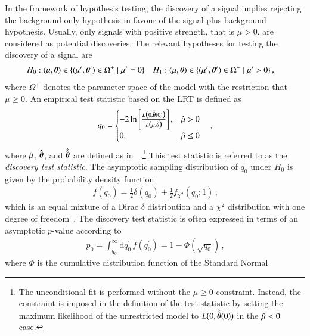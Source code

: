 In the framework of hypothesis testing, the discovery of a signal implies
rejecting the background-only hypothesis in favour of the signal-plus-background
hypothesis. Usually, only signals with positive strength, that is $\mu > 0$, are
considered as potential discoveries. The relevant hypotheses for testing the
discovery of a signal are
\begin{align*}
  &H_0: (\mu, \myvec{\theta}) \in \{ (\mu^\prime, \myvec{\theta}^\prime) \in \Omega^+ \mid \mu^\prime = 0 \}
  &&H_1: (\mu, \myvec{\theta}) \in \{ (\mu^\prime, \myvec{\theta}^\prime) \in \Omega^+ \mid \mu^\prime > 0 \} \,\text{,}
\end{align*}
where $\Omega^+$ denotes the parameter space of the model with the restriction
that $\mu \geq 0$. An empirical test statistic based on the LRT is defined as
\begin{align*}
  q_0 = \begin{cases}
          -2 \ln \left[ \frac{ L\bigl(0, \hat{\hat{\myvec{\theta}}}(0) \bigr)}{L\bigl( \muhat, \hat{\myvec{\theta}} \bigr)} \right], & \muhat > 0 \\
          0,          & \muhat \leq 0
        \end{cases} \quad\text{,}
\end{align*}
where $\hat{\mu}$, $\hat{\myvec{\theta}}$, and $\hat{\hat{\myvec{\theta}}}$ are
defined as in
~\cite{Cowan:2010js}.\footnote{The
  unconditional fit is performed without the $\mu \geq 0$ constraint. Instead,
  the constraint is imposed in the definition of the test statistic by setting
  the maximum likelihood of the unrestricted model to
  $L\bigl( 0, \hat{\hat{\myvec{\theta}}}(0) \bigr)$ in the $\hat{\mu} < 0$ case.}
This test statistic is referred to as the \emph{discovery test statistic}. The
asymptotic sampling distribution of $q_0$ under $H_0$ is given by the
probability density function
\begin{align*}
  f(q_0) = \frac{1}{2} \delta(q_0) + \frac{1}{2} f_{\chi^2}(q_0; 1) \,\text{,}
\end{align*}
which is an equal mixture of a Dirac $\delta$ distribution and a $\chi^2$
distribution with one degree of freedom~\cite{Cowan:2010js}. The discovery test
statistic is often expressed in terms of an asymptotic $p$-value according
to
\begin{align*}
  p_0 = \int_{q_{0}}^\infty \mathrm{d}q_0^\prime \, f(q_0^\prime) =
  1 - \Phi\left(\sqrt{q_{0}}\right) \,\text{,}
\end{align*}
where $\Phi$ is the cumulative distribution function of the Standard Normal
